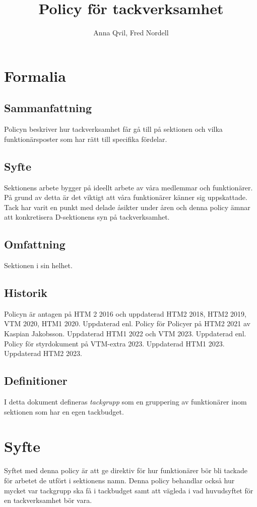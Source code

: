 \documentclass{dsekprotokoll}
\title{Policy för tackverksamhet}
\author{Anna Qvil, Fred Nordell}
\begin{document}
\maketitle
\section{Formalia}
\subsection{Sammanfattning}
Policyn beskriver hur tackverksamhet får gå till på sektionen och vilka funktionärsposter som har rätt till specifika fördelar.

\subsection{Syfte}
Sektionens arbete bygger på ideellt arbete av våra medlemmar och funktionärer. På grund av detta är det viktigt att våra funktionärer känner sig uppskattade. Tack har varit en punkt med delade åsikter under åren och denna policy ämnar att konkretisera D-sektionens syn på tackverksamhet.

\subsection{Omfattning}
Sektionen i sin helhet.

\subsection{Historik}
Policyn är antagen på HTM 2 2016 och uppdaterad HTM2 2018, HTM2 2019, VTM 2020, HTM1 2020.
Uppdaterad enl. Policy för Policyer på HTM2 2021 av Kaspian Jakobsson.
Uppdaterad HTM1 2022 och VTM 2023.
Uppdaterad enl. Policy för styrdokument på VTM-extra 2023.
Uppdaterad HTM1 2023.
Uppdaterad HTM2 2023.

\subsection{Definitioner}
I detta dokument defineras \textit{tackgrupp} som en gruppering
av funktionärer inom sektionen som har en egen tackbudget.



\section{Syfte}
Syftet med denna policy är att ge direktiv för hur funktionärer bör  bli tackade för arbetet de utfört i sektionens namn. Denna policy behandlar också hur mycket var tackgrupp ska få i tackbudget samt att vägleda i vad huvudsyftet för en tackverksamhet bör vara.
\end{document}
